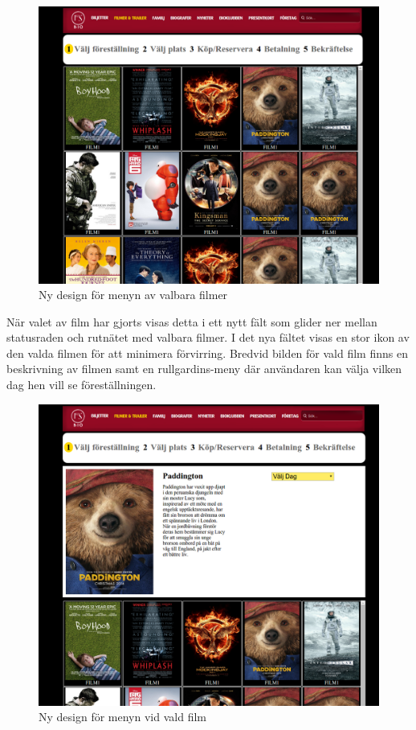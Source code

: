\documentclass[swedish,a4paper,11pt]{article}
\begin{document}
\begin{figure}[H]
\centering
\includegraphics[scale=0.27]{filmermeny.png} 
\caption{Ny design för menyn av valbara filmer}
\end{figure}


\newpage
När valet av film har gjorts visas detta i ett nytt fält som glider ner mellan statusraden och rutnätet med valbara filmer. I det nya fältet visas en stor ikon av den valda filmen för att minimera förvirring. Bredvid bilden för vald film finns en beskrivning av filmen samt en rullgardins-meny där användaren kan välja vilken dag hen vill se föreställningen. 

\begin{figure}[H]
\centering
\includegraphics[scale=0.27]{valdfilm.png} 
\caption{Ny design för menyn vid vald film}
\end{figure}
\end{document}
